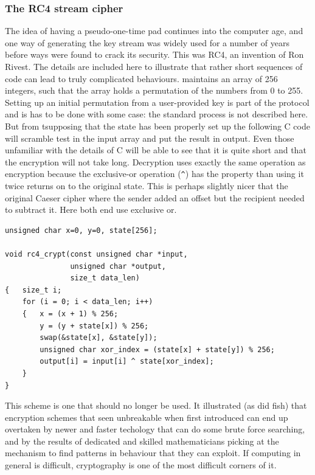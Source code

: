 \subsubsection{The RC4 stream cipher}
The idea of having a pseudo-one-time pad continues into the computer age, and
one way of generating the key stream was widely used for a number of years
before ways were found to crack its security. This was RC4, an invention of Ron
Rivest\cite{RC4_on_wikipedia}. The details are included here to illustrate
that rather short sequences of code can lead to truly complicated behaviours.
maintains an array of 256 integers, such that the array holds a permutation
of the numbers from 0 to 255. Setting up an initial permutation from a
user-provided key is part of the protocol and is has to be done with some
case: the standard process is not described here. But from tsupposing that the
state has been properly set up the following C code will scramble test in the input
array and put the result in output. Even those unfamiliar with the details
of C will be able to see that it is quite short and that the encryption
will not take long. Decryption uses exactly the same operation as encryption
because the exclusive-or operation (\verb+^+) has the property than using it
twice returns on to the original state. This is perhaps slightly nicer that the
original Caeser cipher where the sender added an offset but the recipient needed
to subtract it. Here both end use exclusive or.
\begin{verbatim}
unsigned char x=0, y=0, state[256];

void rc4_crypt(const unsigned char *input,
               unsigned char *output,
               size_t data_len)
{   size_t i;
    for (i = 0; i < data_len; i++)
    {   x = (x + 1) % 256;
        y = (y + state[x]) % 256;
        swap(&state[x], &state[y]);
        unsigned char xor_index = (state[x] + state[y]) % 256;
        output[i] = input[i] ^ state[xor_index];
    }
}
\end{verbatim}
This scheme is one that should no longer be used. It illustrated (as did fish) that
encryption schemes that seen unbreakable when first introduced can end up overtaken
by newer and faster techology that can do some brute force searching, and by
the results of dedicated and skilled mathematicians picking at the mechanism
to find patterns in behaviour that they can exploit. If computing in general
is difficult, cryptography is one of the most difficult corners of it.
